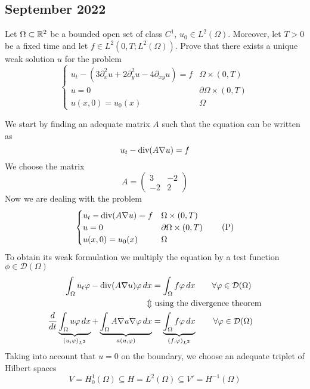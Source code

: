 \newpage
\subsection{September 2022}
\begin{exercise}
    Let \(\Omega \subset \mathbb{R}^2\) be a bounded open set of class \(C^1\), \(u_0 \in L^2(\Omega)\). Moreover, let \(T > 0\) be a fixed time and let \(f \in L^2(0, T; L^2(\Omega))\). Prove that there exists a unique weak solution \(u\) for the problem
    \[
        \begin{cases}
            u_t - \left( 3\partial_{x}^2 u + 2\partial_{y}^2 u - 4 \partial_{xy} u \right) = f & \Omega \times (0, T) \\
            u = 0 & \partial\Omega \times (0, T) \\
            u(x, 0) = u_0(x) & \Omega
        \end{cases}
    \]
\end{exercise}
We start by finding an adequate matrix \(A\) such that the equation can be written as
\[
    u_t - \text{div}(A \nabla u) = f
\]
We choose the matrix
\[
    A = \begin{pmatrix}
        3 & -2 \\
        -2 & 2
    \end{pmatrix}
\]
Now we are dealing with the problem
\[
    \begin{cases}
        u_t - \text{div}(A \nabla u) = f & \Omega \times (0, T) \\
        u = 0 & \partial\Omega \times (0, T) \\
        u(x, 0) = u_0(x) & \Omega
    \end{cases}
    \tag*{(P)}
\]
To obtain its weak formulation we multiply the equation by a test function \(\phi \in \mathcal{D}(\Omega)\) 
\begin{align*}
    \int_\Omega u_t \varphi - \text{div}(A \nabla u) \varphi \, dx &= \int_\Omega f \varphi \, dx \qquad \forall \varphi \in \mathcal{D}(\Omega) \\
    \Updownarrow &\text{ using the divergence theorem} \\
    \frac{d}{dt} \underbrace{\int_\Omega u \varphi \, dx}_{(u, \varphi)_{L^2}} + \underbrace{\int_\Omega A \nabla u \nabla \varphi \, dx}_{a(u,\varphi)} &= \underbrace{\int_\Omega f \varphi \, dx}_{(f, \varphi)_{L^2}} \qquad \forall \varphi \in \mathcal{D}(\Omega) \\
\end{align*}
Taking into account that \(u = 0\) on the boundary, we choose an adequate triplet of Hilbert spaces
\[
    V = H^1_0(\Omega) \subseteq H = L^2(\Omega) \subseteq V' = H^{-1}(\Omega)
\]
